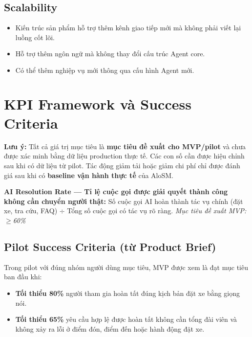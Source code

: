 \documentclass[12pt,a4paper]{article}
\begin{document}
\subsection{Scalability}
\begin{itemize}
  \item Kiến trúc sản phẩm hỗ trợ thêm kênh giao tiếp mới mà không phải viết lại luồng cốt lõi.
  \item Hỗ trợ thêm ngôn ngữ mà không thay đổi cấu trúc Agent core.
  \item Có thể thêm nghiệp vụ mới thông qua cấu hình Agent mới.
\end{itemize}

\section{KPI Framework và Success Criteria}

\begin{tcolorbox}[notebox]
  \textbf{Lưu ý:} Tất cả giá trị mục tiêu là \textbf{mục tiêu đề xuất cho MVP/pilot} và chưa được xác minh bằng dữ liệu production thực tế. Các con số cần được hiệu chỉnh sau khi có dữ liệu từ pilot. Tác động giảm tải hoặc giảm chi phí chỉ được đánh giá sau khi có \textbf{baseline vận hành thực tế} của AloSM.
\end{tcolorbox}

\begin{tcolorbox}[visionbox,title={North Star Metric}]
  \textbf{AI Resolution Rate --- Tỉ lệ cuộc gọi được giải quyết thành công không cần chuyển người thật:}
  Số cuộc gọi AI hoàn thành tác vụ chính (đặt xe, tra cứu, FAQ) $\div$ Tổng số cuộc gọi có tác vụ rõ ràng.
  \textit{Mục tiêu đề xuất MVP: $\geq$60\%}
\end{tcolorbox}

\subsection{Pilot Success Criteria (từ Product Brief)}

Trong pilot với đúng nhóm người dùng mục tiêu, MVP được xem là đạt mục tiêu ban đầu khi:

\begin{itemize}
  \item \textbf{Tối thiểu 80\%} người tham gia hoàn tất đúng kịch bản đặt xe bằng giọng nói.
  \item \textbf{Tối thiểu 65\%} yêu cầu hợp lệ được hoàn tất không cần tổng đài viên và không xảy ra lỗi ở điểm đón, điểm đến hoặc hành động đặt xe.
\end{itemize}
\end{document}
